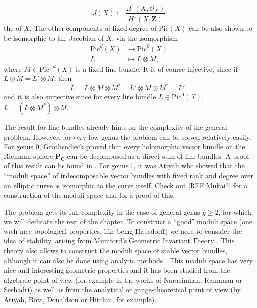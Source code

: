 \documentclass[12pt,a4paper]{book}
\theoremstyle{definition} \newtheorem{defn}[thm]{Definition}
\theoremstyle{definition} \newtheorem{ejemplo}[thm]{Example}
\theoremstyle{remark} \newtheorem{rem}[thm]{Remark}
\def\OO{\mathscr{O}}
\def\CC{\mathbf{C}}
\def\ZZ{\mathbf{Z}}
\def\PP{\mathbf{P}}
\def\Pic{\mathrm{Pic}}
\let\emph\relax
\begin{document}
       \begin{equation*}
	 J(X):=	 \frac{H^1(X,\OO_X)}{H^1(X,\ZZ)}
       \end{equation*}
       the \emph{Jacobian} of $X$. The other components of fixed degree of $\Pic(X)$ can be also shown to be isomorphic to the Jacobian of $X$, via the isomorphism
       \begin{align*}
	  \Pic^d(X)&\longrightarrow \Pic^0(X)\\ 
	   L &\longmapsto L\otimes M, 
	 \end{align*}
	 where $M \in \Pic^{-d}(X)$ is a fixed line bundle. It is of course injective, since if $L\otimes M = L'\otimes M$, then 
	 \begin{equation*}
	   L=L\otimes M \otimes M^* = L' \otimes M \otimes M^* = L',
	 \end{equation*}
	 and it is also surjective since for every line bundle $L \in \Pic^0(X)$, $L=(L\otimes M^*) \otimes M$.
       
	 The result for line bundles already hints on the complexity of the general problem. However, for very low genus the problem can be solved relatively easily. For genus 0, Grothendieck proved that every holomorphic vector bundle on the Riemann sphere $\PP^1_\CC$ can be decomposed as a direct sum of line bundles. A proof of this result can be found in \cite{hartshorne}. For genus 1, it was Atiyah who showed that the ``moduli space'' of indecomposable vector bundles with fixed rank and degree over an elliptic curve is isomorphic to the curve itself. Check out [REF:Mukai?] for a construction of the moduli space and for a proof of this. 

	 The problem gets its full complexity in the case of general genus $g\geq 2$, for which we will dedicate the rest of the chapter. To construct a ``good'' moduli space (one with nice topological properties, like being Hausdorff) we need to consider the idea of stability, arising from Mumford's Geometric Invariant Theory \cite{git}. This theory also allows to construct the moduli space of stable vector bundles, although it can also be done using analytic methods \cite{kobayashi}. This moduli space has very nice and interesting geometric properties and it has been studied from the algebraic point of view (for example in the works of Narasimhan, Ramanan or Seshadri) as well as from the analytical or gauge-theoretical point of view (by Atiyah, Bott, Donaldson or Hitchin, for example).
\end{document}
